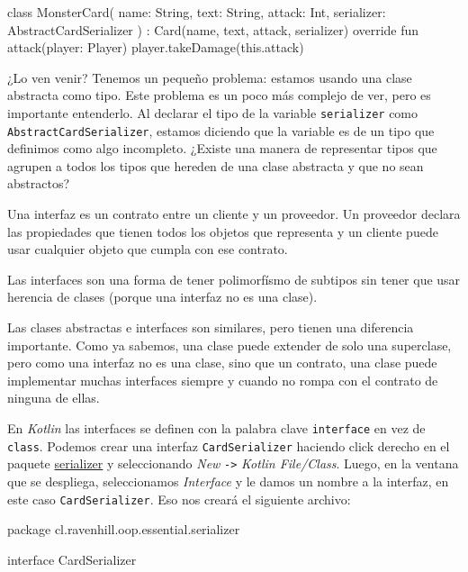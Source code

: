   \begin{kotlin}
    class MonsterCard(
      name: String, text: String, attack: Int,
      serializer: AbstractCardSerializer
    ) : Card(name, text, attack, serializer) {
      override fun attack(player: Player) {
        player.takeDamage(this.attack)
      }
    }
  \end{kotlin}

  ¿Lo ven venir?
  Tenemos un pequeño problema: estamos usando una clase abstracta como tipo.
  Este problema es un poco más complejo de ver, pero es importante entenderlo.
  Al declarar el tipo de la variable \texttt{serializer} como \texttt{AbstractCardSerializer},
  estamos diciendo que la variable es de un tipo que definimos como algo incompleto.
  ¿Existe una manera de representar tipos que agrupen a todos los tipos que hereden de una clase
  abstracta y que no sean abstractos?

  \begin{defaultbox}[Interfaces]
    Una interfaz es un contrato entre un cliente y un proveedor.
    Un proveedor declara las propiedades que tienen todos los objetos que representa y un cliente
    puede usar cualquier objeto que cumpla con ese contrato.
  \end{defaultbox}

  \begin{important}
    Las interfaces son una forma de tener polimorfísmo de subtipos sin tener que usar herencia de 
    clases (porque una interfaz no es una clase).  
  \end{important}
  
  Las clases abstractas e interfaces son similares, pero tienen una diferencia importante.
  Como ya sabemos, una clase puede extender de solo una superclase, pero como una interfaz no es una
  clase, sino que un contrato, una clase puede implementar muchas interfaces siempre y cuando no
  rompa con el contrato de ninguna de ellas.
  
  En \textit{Kotlin} las interfaces se definen con la palabra clave \texttt{interface} en vez de
  \texttt{class}.
  Podemos crear una interfaz \texttt{CardSerializer} haciendo click derecho en el paquete
  \url{serializer} y seleccionando \textit{New} \texttt{->} \textit{Kotlin File/Class}.
  Luego, en la ventana que se despliega, seleccionamos \textit{Interface} y le damos un nombre a la
  interfaz, en este caso \texttt{CardSerializer}.
  Eso nos creará el siguiente archivo:

  \begin{kotlin}
    package cl.ravenhill.oop.essential.serializer

    interface CardSerializer {
    }
  \end{kotlin}

